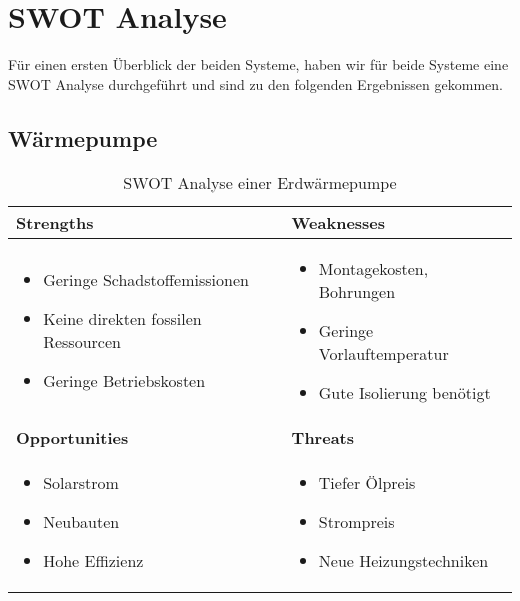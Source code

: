 \chapter{SWOT Analyse}
\label{chap:swot}

Für einen ersten Überblick der beiden Systeme, haben wir für beide Systeme eine SWOT Analyse durchgeführt und sind zu den folgenden Ergebnissen gekommen.

\section{Wärmepumpe}


\begin{table}[h!]
\begin{tabular}[c]{|p{}|p{}|}
  \hline
  \textbf{Strengths} &
  \textbf{Weaknesses} \\ \hline
  
  \begin{itemize}
    \item Geringe Schadstoffemissionen
    \item Keine direkten fossilen Ressourcen
    \item Geringe Betriebskosten
  \end{itemize}
  &
  
  \begin{itemize}
    \item Montagekosten, Bohrungen
    \item Geringe Vorlauftemperatur
    \item Gute Isolierung benötigt
  \end{itemize}
  \\ \hline
  
  \textbf{Opportunities} &
  \textbf{Threats} \\ \hline
  
  \begin{itemize}
    \item Solarstrom
    \item Neubauten
    \item Hohe Effizienz
  \end{itemize}
  &
  
  \begin{itemize}
    \item Tiefer Ölpreis
    \item Strompreis
    \item Neue Heizungstechniken
  \end{itemize}  
  \\ \hline
\end{tabular}
\label{swot:warmepumpe}
\caption{SWOT Analyse einer Erdwärmepumpe}
\end{table}

